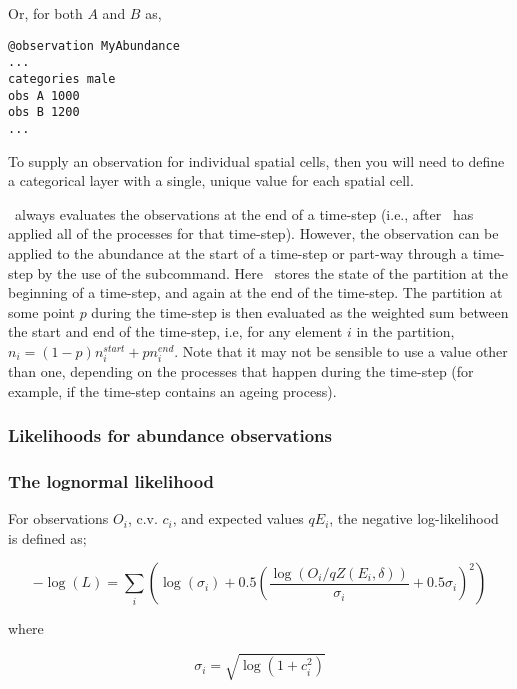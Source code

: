 {{Or, for both $A$ and $B$ as,

{\small{\begin{verbatim}
@observation MyAbundance
...
categories male
obs A 1000
obs B 1200
...
\end{verbatim}}}

To supply an observation for individual spatial cells, then you will need to define a categorical layer with a single, unique value for each spatial cell. 

\TODO

\SPM\ always evaluates the observations at the end of a time-step (i.e., after \SPM\ has applied all of the processes for that time-step). However, the observation can be applied to the abundance at the start of a time-step or part-way through a time-step by the use of the  subcommand. Here \SPM\ stores the state of the partition at the beginning of a time-step, and again at the end of the time-step. The partition at some point $p$ during the time-step is then evaluated as the weighted sum between the start and end of the time-step, i.e, for any element $i$ in the partition, $n_i=(1-p) n_i^{start} + p n_i^{end}$. Note that it may not be sensible to use a value other than one, depending on the processes that happen during the time-step (for example, if the time-step contains an ageing process).

\TODOend

\subsubsection{Likelihoods for abundance observations}

\subsubsection*{The lognormal likelihood}

For observations $O_i$, c.v. $c_i$, and expected values $qE_i$, the negative log-likelihood is defined as;

\begin{equation}
 - \log \left(L \right) = \sum\limits_i \left( \log \left( \sigma _i \right) + 0.5\left( \frac{\log \left(O_i / q Z \left(E_i,\delta \right) \right)}{\sigma_i} + 0.5 \sigma_i \right)^2 \right)
\end{equation}

where 

\begin{equation}
  \sigma_i  = \sqrt{\log \left(1+c_i^2 \right)}
\end{equation}

}}
